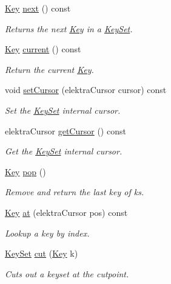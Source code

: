\begin{DoxyCompactItemize}
\hyperlink{classkdb_1_1Key}{Key} \hyperlink{classkdb_1_1KeySet_affd52d130faf184361297f9e7f0c9f16}{next} () const
\begin{DoxyCompactList}\small\item\em Returns the next \hyperlink{classkdb_1_1Key}{Key} in a \hyperlink{classkdb_1_1KeySet}{Key\+Set}. \end{DoxyCompactList}\item 
\hyperlink{classkdb_1_1Key}{Key} \hyperlink{classkdb_1_1KeySet_a0a0fc4efecd6dcbfde5fc35301b60349}{current} () const
\begin{DoxyCompactList}\small\item\em Return the current \hyperlink{classkdb_1_1Key}{Key}. \end{DoxyCompactList}\item 
void \hyperlink{classkdb_1_1KeySet_aa36d35d8f12233a4c8f88d9bb13429c3}{set\+Cursor} (elektra\+Cursor cursor) const
\begin{DoxyCompactList}\small\item\em Set the \hyperlink{classkdb_1_1KeySet}{Key\+Set} internal cursor. \end{DoxyCompactList}\item 
elektra\+Cursor \hyperlink{classkdb_1_1KeySet_accc11bcf2a4b5937ce9f0787c011c2d9}{get\+Cursor} () const
\begin{DoxyCompactList}\small\item\em Get the \hyperlink{classkdb_1_1KeySet}{Key\+Set} internal cursor. \end{DoxyCompactList}\item 
\hyperlink{classkdb_1_1Key}{Key} \hyperlink{classkdb_1_1KeySet_a7f207457a1c12633a1a5301a3a1bbaed}{pop} ()
\begin{DoxyCompactList}\small\item\em Remove and return the last key of {\ttfamily ks}. \end{DoxyCompactList}\item 
\hyperlink{classkdb_1_1Key}{Key} \hyperlink{classkdb_1_1KeySet_a40e32f2d9f34f03fa8ec85945f49b630}{at} (elektra\+Cursor pos) const
\begin{DoxyCompactList}\small\item\em Lookup a key by index. \end{DoxyCompactList}\item 
\hyperlink{classkdb_1_1KeySet}{Key\+Set} \hyperlink{classkdb_1_1KeySet_ab283da798a7670d5c3f0e1a5b821e666}{cut} (\hyperlink{classkdb_1_1Key}{Key} k)
\begin{DoxyCompactList}\small\item\em Cuts out a keyset at the cutpoint. \end{DoxyCompactList}\item 

\end{DoxyCompactItemize}
